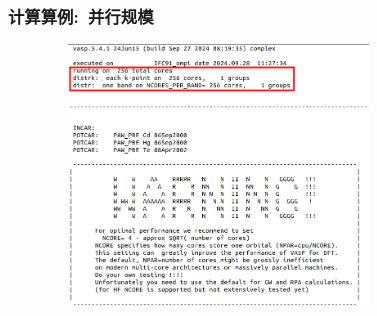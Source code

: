 \frame
{
	\frametitle{计算算例:~并行规模}
\begin{figure}[h!]
\centering
\vskip -0.15in
\includegraphics[height=2.75in,width=3.55in,viewport=0 150 735 645,clip]{Figures/VASP_huge_OUTCAR.png}
\label{VASP_Parallel}
\end{figure} 
}

%
%
%

